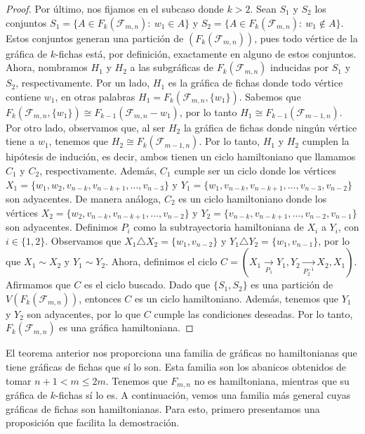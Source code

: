 \begin{proof}
    Por \'ultimo, nos fijamos en el subcaso donde $k>2$. Sean $S_1$ y $S_2$ los
    conjuntos $S_1=\{A \in F_k(\mathcal{F}_{m,n}) \colon\ w_1 \in A\}$ y
    $S_2=\{A \in F_k(\mathcal{F}_{m,n}) \colon\ w_1 \notin A\}$. Estos conjuntos
    generan una partici\'on de $(F_k(\mathcal{F}_{m,n}))$, pues todo v\'ertice
    de la gr\'afica de $k$-fichas est\'a, por definici\'on, exactamente en
    alguno de estos conjuntos. Ahora, nombramos $H_1$ y $H_2$ a las
    subgr\'aficas de $F_k(\mathcal{F}_{m,n})$ inducidas por $S_1$ y $S_2$,
    respectivamente. Por un lado, $H_1$ es la gr\'afica de fichas donde todo
    v\'ertice contiene $w_1$, en otras palabras $H_1=
    F_k(\mathcal{F}_{m,n},\{w_1\})$. Sabemos que $F_k(\mathcal{F}_{m,n},\{w_1\})
    \cong F_{k-1}(\mathcal{F}_{m,n}- w_1)$, por lo tanto $H_1 \cong
    F_{k-1}(\mathcal{F}_{m-1,n})$. Por otro lado, observamos que, al ser $H_2$
    la gr\'afica de fichas donde ning\'un v\'ertice tiene a $w_1$, tenemos que
    $H_2 \cong F_k(\mathcal{F}_{m-1,n})$. Por lo tanto, $H_1$ y $H_2$ cumplen la
    hip\'otesis de induci\'on, es decir, ambos tienen un ciclo hamiltoniano que
    llamamos $C_1$ y $C_2$, respectivamente. Adem\'as, $C_1$ cumple ser un ciclo
    donde los v\'ertices $X_1 = \{w_1, w_2,v_{n-k},v_{n-k+1}, \dots, v_{n-3}\}$
    y $Y_1 = \{w_1,v_{n-k},v_{n-k+1}, \dots, v_{n-3},v_{n-2}\}$ son adyacentes.
    De manera an\'aloga, $C_2$ es un ciclo hamiltoniano donde los v\'ertices
    $X_2 = \{ w_2,v_{n-k},v_{n-k+1}, \dots, v_{n-2}\}$ y $Y_2 =
    \{v_{n-k},v_{n-k+1}, \dots, v_{n-2},v_{n-1}\}$ son adyacentes. Definimos
    $P_i$ como la subtrayectoria hamiltoniana de $X_i$ a $Y_i$, con $i \in \{
    1,2 \}$. Observamos que $X_1 \triangle X_2 = \{w_1,v_{n-2}\}$ y $Y_1
    \triangle Y_2 = \{w_1, v_{n-1}\}$, por lo que $X_1 \sim X_2$ y $Y_1 \sim
    Y_2$. Ahora, definimos el ciclo $C = (X_1 \xrightarrow[P_1]{}Y_1,Y_2
    \xrightarrow[P_2^{-1}]{}X_2,X_1)$. Afirmamos que $C$ es el ciclo buscado.
    Dado que $\{S_1,S_2\}$ es una partici\'on de $V(F_k(\mathcal{F}_{m,n}))$,
    entonces $C$ es un ciclo hamiltoniano. Adem\'as, tenemos que $Y_1$ y $Y_2$
    son adyacentes, por lo que $C$ cumple las condiciones deseadas. Por lo
    tanto, $F_k(\mathcal{F}_{m,n})$ es una gr\'afica hamiltoniana.
\end{proof}

El teorema anterior nos proporciona una familia de gr\'aficas no hamiltonianas
que tiene gr\'aficas de fichas que s\'i lo son. Esta familia son los abanicos
obtenidos de tomar $n+1 < m \leq 2m$. Tenemos que $F_{m,n}$ no es hamiltoniana,
mientras que su gr\'afica de $k$-fichas s\'i lo es. A continuaci\'on, vemos una
familia m\'as general cuyas gr\'aficas de fichas son hamiltonianas. Para esto,
primero presentamos una proposici\'on que facilita la demostraci\'on.

